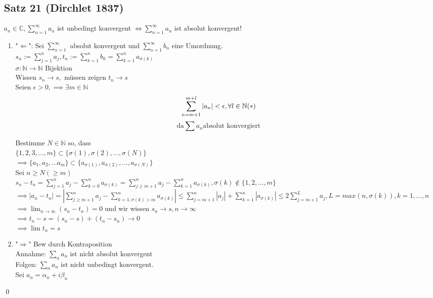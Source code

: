 \documentclass[fleqn]{scrbook}
\renewenvironment{proof}{{\bfseries Beweis }}{\qed}
\begin{document}
\subsection{Satz 21 (Dirchlet 1837)}
$a_n \in\mathbb{C}, \sum_{n=1}^\infty a_n$ ist unbedingt konvergent $\Leftrightarrow \sum_{n=1}^\infty a_n$ ist absolut konvergent!\\
\begin{proof}
\begin{enumerate}[1)]
\item "$\Leftarrow$": Sei $\sum_{n=1}^\infty$ absolut konvergent und $\sum_{n=1}^\infty b_n$ eine Umordnung.\\
$s_n := \sum_{j=1}^n a_j, t_n := \sum_{k=1}^n b_k = \sum_{k=1}^n a_{\sigma (k)}$\\
$\sigma : \mathbb{N} \rightarrow \mathbb{N}$ Bijektion\\
Wissen $s_n \rightarrow s,$ müssen zeigen $t_n \rightarrow s$\\
Seien $\epsilon > 0, \implies \exists m \in\mathbb{N}$\\
$$\sum_{n=m+1}^{m+l} |a_n| < \epsilon, \forall l \in\mathbb{N}\text{(\textasteriskcentered )}$$
$$\text{da} \sum a_n \text{absolut konvergiert}$$

Bestimme $N \in \mathbb{N}$ so, dass\\
$\{ 1,2,3,\ldots,m\} \subset \{ \sigma (1), \sigma (2), \ldots, \sigma (N)\}$\\
$\implies \{a_1, a_2, \ldots a_m\} \subset \{a_{\sigma (1)}, a_{\sigma(2)}, \ldots , a_{\sigma (N)}\}$\\
Sei $n\geq N (\geq m)$\\
$s_n - t_n = \sum_{j=1}^n a_j - \sum_{k=0}^n a_{\sigma (k)} = \sum_{j \geq m + 1}^n a_j - \sum_{k=1}^n a_{\sigma (k)}, \sigma (k) \notin \{1,2,\ldots ,m\}$\\
$\implies |a_n - t_n| = |\sum_{j\geq m + 1}^n a_j - \sum_{k=1, \sigma(k) > m}^n a_{\sigma (k)}| \leq \sum_{j=m+1}^n |a_j| + \sum_{k=1}^n |a_{\sigma (k)}| \leq 2 \sum_{j=m+1}^L a_j, L = max(n, \sigma (k)), k=1,\ldots ,n$\\
$\implies \lim_{n\rightarrow\infty} (s_n - t_n) = 0$ und wir wissen $s_n \rightarrow s, n \rightarrow\infty$\\
$\implies t_n - s = (s_n - s) + (t_n - s_n) \rightarrow 0$\\
$\implies \lim t_n = s$ \checkmark

\item "$\Rightarrow$" Bew durch Kontraposition\\
Annahme: $\sum_n a_n$ ist nicht absolut konvergent\\
Folgen: $\sum_n a_n$ ist nicht unbedingt konvergent.\\
Sei $a_n = \alpha_n + i \beta_n$
\end{enumerate}
\end{proof}
\end{document}
